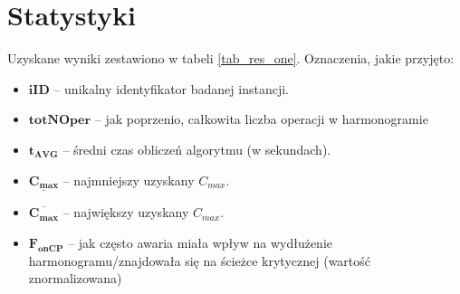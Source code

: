 \documentclass[printmode,oneside]{mgr}
\begin{document}
\section{Statystyki}
Uzyskane wyniki zestawiono w tabeli \ref{tab_res_one}. Oznaczenia, jakie przyjęto:
\begin{itemize}
	\item $\mathbf{iID}$ -- unikalny identyfikator badanej instancji.
	\item $\mathbf{totNOper}$ -- jak poprzenio, całkowita liczba operacji w harmonogramie
	\item $\mathbf{t_{AVG}}$ -- średni czas obliczeń algorytmu (w sekundach).
	\item $\mathbf{\underline{C_{max}}}$ -- najmniejszy uzyskany $C_{max}$.
	\item $\mathbf{\overline{C_{max}}}$ -- największy uzyskany $C_{max}$.
	\item $\mathbf{F_{onCP}}$ -- jak często awaria miała wpływ na wydłużenie harmonogramu/znajdowała się na ścieżce krytycznej (wartość znormalizowana)
\end{itemize}
\end{document}
